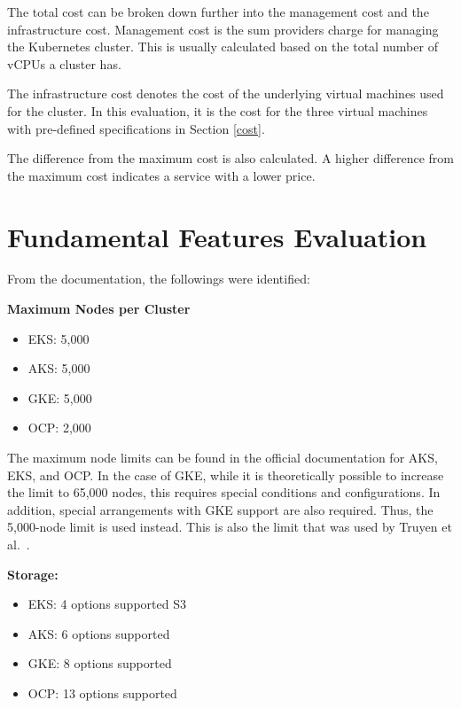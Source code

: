 \FloatBarrier

The total cost can be broken down further into the management cost and the infrastructure cost. Management cost is the sum providers charge for managing the Kubernetes cluster. This is usually calculated based on the total number of vCPUs a cluster has.

The infrastructure cost denotes the cost of the underlying virtual machines used for the cluster. In this evaluation, it is the cost for the three virtual machines with pre-defined specifications in Section \ref{cost}.

The difference from the maximum cost is also calculated. A higher difference from the maximum cost indicates a service with a lower price.

\section{Fundamental Features Evaluation}

From the documentation, the followings were identified:

\textbf{Maximum Nodes per Cluster}

\begin{itemize}
\tightlist
\item
  EKS: 5,000 \cite{KnownLimitsService}
\item
  AKS: 5,000  \cite{nickomangLimitsResourcesSKUs2024}
\item
  GKE: 5,000 \cite{QuotasLimitsGoogle}
\item
  OCP: 2,000  \cite{Chapter4Planning}
\end{itemize}

The maximum node limits can be found in the official documentation for AKS, EKS, and OCP. In the case of
GKE, while it is theoretically possible to increase the limit to 65,000
nodes, this requires special conditions and configurations. In addition,
special arrangements with GKE support are also required. Thus, the 5,000-node limit is used instead. This is also the limit that was used by
Truyen et al.~\cite{truyenManagingFeatureCompatibility2020}.

\textbf{Storage:}

\begin{itemize}
\tightlist
\item
  EKS: 4 options supported
  S3 \cite{StoreApplicationData}
\item
     AKS: 6 options supported \cite{tamramConceptsStorageAzure2024}
\item
  GKE: 8 options supported \cite{StorageGKEClusters} 
\item
  OCP: 13 options supported \cite{UnderstandingPersistentStorage} 
\end{itemize}

